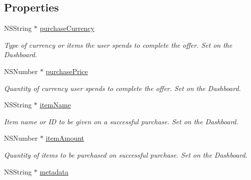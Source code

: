 \subsection*{Properties}
\begin{DoxyCompactItemize}
\item 
\hypertarget{interface_fuse_virtual_goods_offer_object_a60cbcab572527ebc765b0fcbba5e1bdc}{}N\+S\+String $\ast$ \hyperlink{interface_fuse_virtual_goods_offer_object_a60cbcab572527ebc765b0fcbba5e1bdc}{purchase\+Currency}\label{interface_fuse_virtual_goods_offer_object_a60cbcab572527ebc765b0fcbba5e1bdc}

\begin{DoxyCompactList}\small\item\em Type of currency or items the user spends to complete the offer. Set on the Dashboard. \end{DoxyCompactList}\item 
\hypertarget{interface_fuse_virtual_goods_offer_object_a860943b511058dbaace8344976c6000f}{}N\+S\+Number $\ast$ \hyperlink{interface_fuse_virtual_goods_offer_object_a860943b511058dbaace8344976c6000f}{purchase\+Price}\label{interface_fuse_virtual_goods_offer_object_a860943b511058dbaace8344976c6000f}

\begin{DoxyCompactList}\small\item\em Quantity of currency user spends to complete the offer. Set on the Dashboard. \end{DoxyCompactList}\item 
\hypertarget{interface_fuse_virtual_goods_offer_object_afc44eae0ea1010ef7b02515dfc156e68}{}N\+S\+String $\ast$ \hyperlink{interface_fuse_virtual_goods_offer_object_afc44eae0ea1010ef7b02515dfc156e68}{item\+Name}\label{interface_fuse_virtual_goods_offer_object_afc44eae0ea1010ef7b02515dfc156e68}

\begin{DoxyCompactList}\small\item\em Item name or I\+D to be given on a successful purchase. Set on the Dashboard. \end{DoxyCompactList}\item 
\hypertarget{interface_fuse_virtual_goods_offer_object_a3eb537b8ee870de5085c035c1de25a31}{}N\+S\+Number $\ast$ \hyperlink{interface_fuse_virtual_goods_offer_object_a3eb537b8ee870de5085c035c1de25a31}{item\+Amount}\label{interface_fuse_virtual_goods_offer_object_a3eb537b8ee870de5085c035c1de25a31}

\begin{DoxyCompactList}\small\item\em Quantity of items to be purchased on successful purchase. Set on the Dashboard. \end{DoxyCompactList}\item 
\hypertarget{interface_fuse_virtual_goods_offer_object_afc36b7d289310bebbe7a9979348c1a0b}{}N\+S\+String $\ast$ \hyperlink{interface_fuse_virtual_goods_offer_object_afc36b7d289310bebbe7a9979348c1a0b}{metadata}\label{interface_fuse_virtual_goods_offer_object_afc36b7d289310bebbe7a9979348c1a0b}


\end{DoxyCompactItemize}
